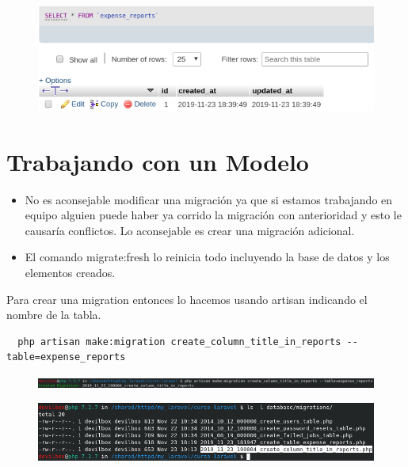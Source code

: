 \documentclass{article}
\begin{document}
\begin{figure}[h!]
  \centering
  \includegraphics[scale=0.5]{./Pictures/041_registro_expense_reports.png}
\end{figure}


\section{Trabajando con un Modelo}%
\begin{itemize}
  \item No es aconsejable modificar una migración ya que si estamos trabajando
    en equipo alguien puede haber ya corrido la migración con anterioridad y
    esto le causaría conflictos. Lo aconsejable es crear una migración
    adicional.
  \item El comando migrate:fresh lo reinicia todo incluyendo la base de datos y
    los elementos creados.
\end{itemize}

Para crear una migration entonces lo hacemos usando artisan indicando el nombre
de la tabla.
\begin{verbatim}
  php artisan make:migration create_column_title_in_reports --table=expense_reports
\end{verbatim}

\begin{figure}[h!]
  \centering
  \includegraphics[scale=0.5]{./Pictures/040_migration_file.png}
\end{figure}

\begin{figure}[h!]
  \centering
  \includegraphics[scale=0.5]{./Pictures/042_php_migration.png}
\end{figure}
\end{document}
